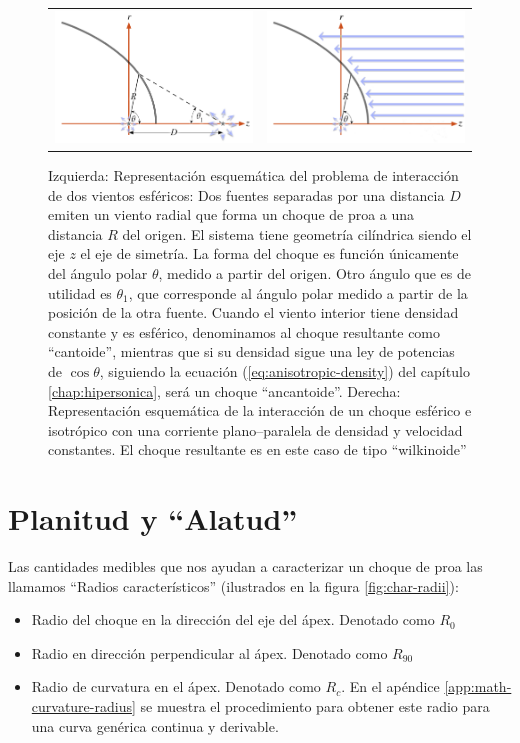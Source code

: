 \begin{figure}
  \begin{tabular}{lr}
    \includegraphics[width=0.45\linewidth]{./Figures/bowshock-crw-variables} &
    \includegraphics[width=0.45\linewidth]{./Figures/wilkinoid}
  \end{tabular}
  \caption{Izquierda: Representación esquemática del problema de interacción de dos vientos esféricos: Dos fuentes separadas por una distancia $D$ emiten un viento radial que forma un choque de proa a una distancia $R$ del origen. El sistema tiene geometría cilíndrica siendo el eje $z$ el eje de simetría. La forma del choque es función únicamente del ángulo polar $\theta$, medido a partir del origen. Otro ángulo que es de utilidad es $\theta_1$, que corresponde al ángulo polar medido a partir de la posición de la otra fuente. Cuando el viento interior tiene densidad constante y es esférico, denominamos al choque resultante como ``cantoide'', mientras que si su densidad sigue una ley de potencias de $\cos\theta$, siguiendo la ecuación (\ref{eq:anisotropic-density}) del capítulo \ref{chap:hipersonica}, será un choque ``ancantoide''. Derecha: Representación esquemática de la interacción de un choque esférico e isotrópico con una corriente plano--paralela de densidad y velocidad constantes. El choque resultante es en este caso de tipo ``wilkinoide''}
    \label{fig:crw-esquema}
\end{figure}

\section{Planitud y ``Alatud''}
\label{sec:char-rad}
Las cantidades medibles que nos ayudan a caracterizar un choque de proa las llamamos ``Radios característicos'' (ilustrados en la figura \ref{fig:char-radii}):
\begin{itemize}
\item Radio del choque en la dirección del eje del ápex. Denotado como $R_0$
\item Radio en dirección perpendicular al ápex. Denotado como $R_{90}$
\item Radio de curvatura en el ápex. Denotado como $R_c$. En el apéndice \ref{app:math-curvature-radius} se muestra el procedimiento para obtener este radio para una curva genérica continua y derivable.
\end{itemize}

